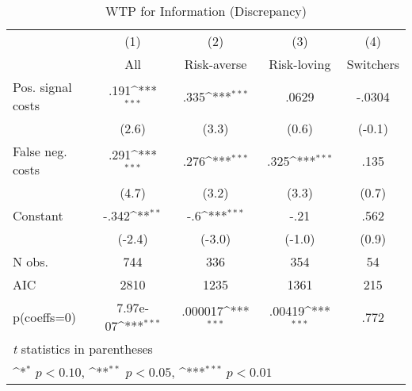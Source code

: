 \begin{table}[htbp]\centering
\def\sym#1{\ifmmode^{#1}\else\(^{#1}\)\fi}
\caption{WTP for Information (Discrepancy)}
\begin{tabular}{l*{4}{c}}
\hline\hline
                &\multicolumn{1}{c}{(1)}&\multicolumn{1}{c}{(2)}&\multicolumn{1}{c}{(3)}&\multicolumn{1}{c}{(4)}\\
                &\multicolumn{1}{c}{All}&\multicolumn{1}{c}{Risk-averse}&\multicolumn{1}{c}{Risk-loving}&\multicolumn{1}{c}{Switchers}\\
\hline
Pos. signal costs&     .191\sym{***}&     .335\sym{***}&    .0629         &   -.0304         \\
                &    (2.6)         &    (3.3)         &    (0.6)         &   (-0.1)         \\
False neg. costs&     .291\sym{***}&     .276\sym{***}&     .325\sym{***}&     .135         \\
                &    (4.7)         &    (3.2)         &    (3.3)         &    (0.7)         \\
Constant        &    -.342\sym{**} &      -.6\sym{***}&     -.21         &     .562         \\
                &   (-2.4)         &   (-3.0)         &   (-1.0)         &    (0.9)         \\
\hline
N obs.          &      744         &      336         &      354         &       54         \\
AIC             &     2810         &     1235         &     1361         &      215         \\
p(coeffs=0)     & 7.97e-07\sym{***}&  .000017\sym{***}&   .00419\sym{***}&     .772         \\
\hline\hline
\multicolumn{5}{l}{\footnotesize \textit{t} statistics in parentheses}\\
\multicolumn{5}{l}{\footnotesize \sym{*} \(p<0.10\), \sym{**} \(p<0.05\), \sym{***} \(p<0.01\)}\\
\end{tabular}
\end{table}

